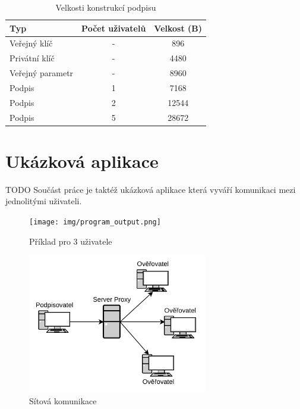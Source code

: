 \begin{table}[htbp]
  \centering
  \caption{Velkosti konstrukcí podpisu}
  \begin{tabular}{|l|c|c|}
    \hline
    Typ              & Počet uživatelů & Velkost (B) \\
    \hline
    Veřejný klíč     & -               & 896         \\
    Privátní klíč    & -               & 4480        \\
    Veřejný parametr & -               & 8960        \\
    Podpis           & 1               & 7168        \\
    Podpis           & 2               & 12544       \\
    Podpis           & 5               & 28672       \\
    \hline
  \end{tabular}
  \label{sizes}
\end{table}




\section{Ukázková aplikace}
TODO
Součást práce je taktéž ukázková aplikace která vyváří komunikaci mezi jednolitými uživateli.

\begin{figure}[htbp]
  \centering
  \texttt{[image: img/program\_output.png]}
  \caption{Příklad pro 3 uživatele}
  \label{program_output}
\end{figure}

\begin{figure}[htbp]
  \centering
  \includegraphics[width=0.7\textwidth]{img/network_diagram.pdf}
  \caption{Sítová komunikace}
  \label{network_diagram}
\end{figure}

